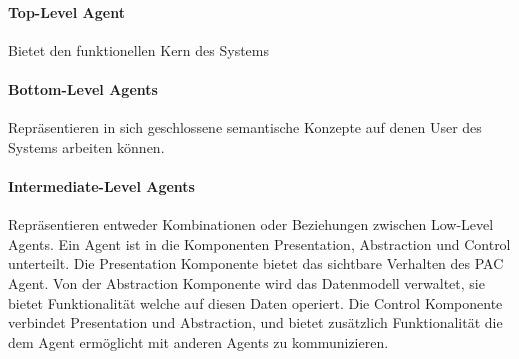 \paragraph{Top-Level Agent} Bietet den funktionellen Kern des Systems
\paragraph{Bottom-Level Agents} Repräsentieren in sich geschlossene semantische Konzepte auf denen User des Systems arbeiten können. 
\paragraph{Intermediate-Level Agents} Repräsentieren entweder Kombinationen oder Beziehungen zwischen Low-Level Agents. 
Ein Agent ist in die Komponenten Presentation, Abstraction und Control unterteilt. Die Presentation Komponente bietet das sichtbare Verhalten des PAC Agent. Von der Abstraction Komponente wird das Datenmodell verwaltet, sie bietet Funktionalität welche auf diesen Daten operiert. Die Control Komponente verbindet Presentation und Abstraction, und bietet zusätzlich Funktionalität die dem Agent ermöglicht mit anderen Agents zu kommunizieren.
